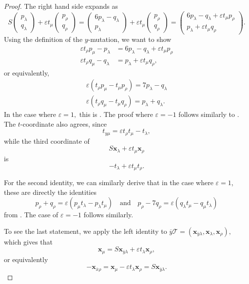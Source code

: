 \documentclass[11pt, reqno]{amsart}
\theoremstyle{remark}
\numberwithin{equation}{subsection}
\numberwithin{figure}{section}
\theoremstyle{customremark}
\newcommand{\Tt}{\mathcal{T}}
\newcommand{\ovx}{{\ov{x}}}
\newcommand{\ovy}{{\ov{y}}}
\newcommand{\ov}{\overline}
\newcommand{\la}{{\lambda}}
\newcommand{\eps}{\varepsilon}
\begin{document}
\begin{proof}
The right hand side expands as
\begin{equation*}
S\begin{pmatrix} p_\lambda \\ q_\lambda \end{pmatrix} 
+ \varepsilon t_\mu \begin{pmatrix} p_\rho \\ q_\rho \end{pmatrix} 
= \begin{pmatrix} 6p_\lambda - q_\lambda \\ p_\lambda \end{pmatrix} 
+ \varepsilon t_\mu \begin{pmatrix} p_\rho \\ q_\rho \end{pmatrix} 
= \begin{pmatrix} 6p_\lambda - q_\lambda + \varepsilon t_\mu p_\rho \\ 
p_\lambda + \varepsilon t_\mu q_\rho \end{pmatrix}.
\end{equation*}
Using the definition of the $y$-mutation, we want to show
\begin{align*}
\varepsilon t_\rho p_\mu - p_\lambda &= 6p_\lambda - q_\lambda 
    + \varepsilon t_\mu p_\rho \\
\varepsilon t_\rho q_\mu - q_\lambda &= p_\lambda 
    + \varepsilon t_\mu q_\rho,
\end{align*}
or equivalently, 
\begin{align*}
    \eps(t_\rho p_\mu-t_\mu p_\rho)=7p_\la -q_\la \\
    \eps(t_\rho q_\mu-t_\mu q_\rho)=p_\la+q_\la. 
\end{align*}
In the case where $\eps=1,$ this is \cite[Lemma 4.6(i)]{M1}. The proof where $\eps=-1$ follows similarly to \cite[Lemma 4.6(i)]{M1}.  The \(t\)-coordinate also agrees, since
\[
t_{y\mu}=\eps t_\rho t_\mu-t_\lambda,
\]
while the third coordinate of
\[
S\bm{x}_\lambda+\eps t_\mu\bm{x}_\rho
\]
is
\[
-t_\lambda+\eps t_\mu t_\rho.
\]

For the second identity, we can similarly derive that in the case where $\eps=1$, these are directly the identities
\[ p_\rho+q_\rho=\eps(p_\mu t_\la-p_\la t_\mu) \quad \text{and} \quad p_\rho-7q_\rho=\eps(q_\la t_\mu-q_\mu t_\la)\] 
from 
 \cite[Lemma 4.6(ii)]{M1}. The case of $\eps=-1$ follows similarly. 
 
 
 To see the last statement, we apply the left identity to $\ov{y}\Tt=(\bm{x}_{\ovy\la},\bm{x}_\la,\bm{x}_\rho),$ which gives that 
 \[ \bm{x}_\mu =S\bm{x}_{\ovy\la}+\eps t_\la \bm{x}_\rho,\]
 or equivalently
 \[-\bm{x}_{\ovx\rho}= \bm{x}_\mu-\eps t_\la \bm{x}_\rho=S\bm{x}_{\ovy\la}.\]

 

\end{proof}
\end{document}
